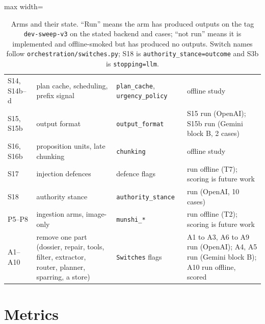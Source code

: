 \begin{table}[H]
\begin{adjustbox}{max width=\textwidth}
\begin{tabular}{@{}lp{5.2cm}p{3.5cm}l@{}}
S14, S14b--d & plan cache, scheduling, prefix signal \citep{zheng2024sglang} & \texttt{plan\_cache}, \texttt{urgency\_policy} & offline study \\
S15, S15b & output format \citep{tam2024speak} & \texttt{output\_format} & S15 run (OpenAI); S15b run (Gemini block B, 2 cases) \\
S16, S16b & proposition units, late chunking \citep{chen2024densex} & \texttt{chunking} & offline study \\
S17 & injection defences \citep{beurerkellner2025patterns} & defence flags & run offline (T7); scoring is future work \\
S18 & authority stance \citep{wachsmuth2018} & \texttt{authority\_stance} & run (OpenAI, 10 cases) \\
P5--P8 & ingestion arms, image-only \citep{yu2025visrag,faysse2025colpali} & \texttt{munshi\_*} & run offline (T2); scoring is future work \\
A1--A10 & remove one part (dossier, repair, tools, filter, extractor, router, planner, sparring, a store) & \texttt{Switches} flags & A1 to A3, A6 to A9 run (OpenAI); A4, A5 run (Gemini block B); A10 run offline, scored \\
\bottomrule
\end{tabular}
\end{adjustbox}
\caption{Arms and their state. ``Run'' means the arm has produced outputs on the tag \texttt{dev-sweep-v3} on the stated backend and cases; ``not run'' means it is implemented and offline-smoked but has produced no outputs. Switch names follow \texttt{orchestration/switches.py}; S18 is \texttt{authority\_stance=outcome} and S3b is \texttt{stopping=llm}.}
\end{table}

\section{Metrics}
\label{app:metrics}

